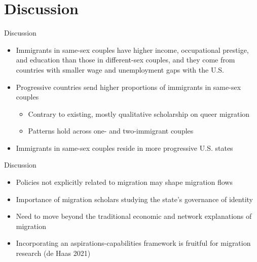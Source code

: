 \documentclass[
  ignorenonframetext,
]{beamer}
\providecommand{\tightlist}{%
  \setlength{\itemsep}{0pt}\setlength{\parskip}{0pt}}
\begin{document}
\hypertarget{discussion}{%
\section{Discussion}\label{discussion}}

\begin{frame}{Discussion}
\protect\hypertarget{discussion-1}{}
\begin{itemize}
\tightlist
\item
  Immigrants in same-sex couples have higher income, occupational
  prestige, and education than those in different-sex couples, and they
  come from countries with smaller wage and unemployment gaps with the
  U.S.
\item
  Progressive countries send higher proportions of immigrants in
  same-sex couples

  \begin{itemize}
  \tightlist
  \item
    Contrary to existing, mostly qualitative scholarship on queer
    migration
  \item
    Patterns hold across one- and two-immigrant couples
  \end{itemize}
\item
  Immigrants in same-sex couples reside in more progressive U.S. states
\end{itemize}
\end{frame}

\begin{frame}{Discussion}
\protect\hypertarget{discussion-2}{}
\begin{itemize}
\tightlist
\item
  Policies not explicitly related to migration may shape migration flows
\item
  Importance of migration scholars studying the state's governance of
  identity
\item
  Need to move beyond the traditional economic and network explanations
  of migration
\item
  Incorporating an aspirations-capabilities framework is fruitful for
  migration research (de Haas 2021)
\end{itemize}
\end{frame}
\end{document}

